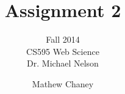 \documentclass[10pt,letterpaper]{scrartcl}
\begin{document}
\author{Mathew Chaney}
\title{Assignment 2}
\subtitle{Fall 2014\\ CS595 Web Science\\ Dr. Michael Nelson}
\maketitle
\newpage

\tableofcontents
\listoffigures
\lstlistoflistings


% 
% 
\end{document}
